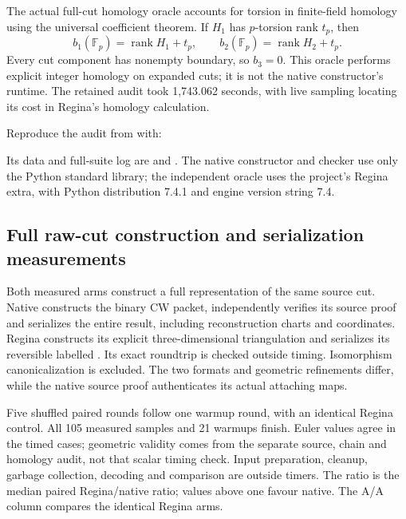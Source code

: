 The actual full-cut homology oracle accounts for torsion in finite-field
homology using the universal coefficient theorem. If $H_1$ has $p$-torsion
rank $t_p$, then
\[
       b_1(\mathbb F_p)=\operatorname{rank}H_1+t_p,
       \qquad b_2(\mathbb F_p)=\operatorname{rank}H_2+t_p.
\]
Every cut component has nonempty boundary, so $b_3=0$. This oracle performs
explicit integer homology on expanded cuts; it is not the native constructor's
runtime. The retained audit took 1,743.062 seconds, with live sampling locating
its cost in Regina's homology calculation.

Reproduce the audit from  with:
\begin{quote}\small
{}
\end{quote}
Its data and full-suite log are  and
. The native constructor and checker use
only the Python standard library; the independent oracle uses the project's
Regina extra, with Python distribution 7.4.1 and engine version string 7.4.

\subsection{Full raw-cut construction and serialization measurements}

Both measured arms construct a full representation of the same source cut.
Native constructs the binary CW packet, independently verifies its source
proof and serializes the entire result, including reconstruction charts and
coordinates. Regina constructs its explicit three-dimensional triangulation
and serializes its reversible labelled . Its exact
 roundtrip is checked outside timing. Isomorphism
canonicalization is excluded. The two formats and geometric refinements
differ, while the native source proof authenticates its actual attaching maps.

Five shuffled paired rounds follow one warmup round, with an identical
Regina control. All 105 measured samples and 21 warmups finish. Euler values
agree in the timed cases; geometric validity comes from the separate source,
chain and homology audit, not that scalar timing check. Input preparation,
cleanup, garbage collection, decoding and comparison are outside timers.
The ratio is the median paired Regina/native ratio; values above one favour
native. The A/A column compares the identical Regina arms.


